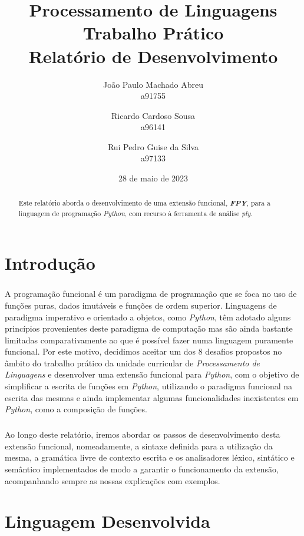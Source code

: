 \documentclass[11pt,a4paper]{report}
\title{Processamento de Linguagens\\
       \textbf{Trabalho Prático}\\ Relatório de Desenvolvimento}
\author{João Paulo Machado Abreu\\ a91755
        \and Ricardo Cardoso Sousa\\ a96141
        \and Rui Pedro Guise da Silva\\ a97133}
\date{28 de maio de 2023}
\begin{document}
\maketitle

\begin{abstract}
\paragraph*{}
Este relatório aborda o desenvolvimento de uma extensão funcional, \textbf{\textit{FPY}}, para a linguagem de programação \textit{Python}, com recurso à ferramenta de análise \textit{ply}.
\end{abstract}

\tableofcontents

\chapter{Introdução} \label{chap:intro}
\paragraph*{}
A programação funcional é um paradigma de programação que se foca no uso de funções puras, dados imutáveis e funções de ordem superior. Linguagens de paradigma imperativo e orientado a objetos, como \textit{Python}, têm adotado alguns princípios provenientes deste paradigma de computação mas são ainda bastante limitadas comparativamente ao que é possível fazer numa linguagem puramente funcional. Por este motivo, decidimos aceitar um dos 8 desafios propostos no âmbito do trabalho prático da unidade curricular de \textit{Processamento de Linguagens} e desenvolver uma extensão funcional para \textit{Python}, com o objetivo de simplificar a escrita de funções em \textit{Python}, utilizando o paradigma funcional na escrita das mesmas e ainda implementar algumas funcionalidades inexistentes em \textit{Python}, como a composição de funções.
\paragraph*{}
Ao longo deste relatório, iremos abordar os passos de desenvolvimento desta extensão funcional, nomeadamente, a sintaxe definida para a utilização da mesma, a gramática livre de contexto escrita e os analisadores léxico, sintático e semântico implementados de modo a garantir o funcionamento da extensão, acompanhando sempre as nossas explicações com exemplos.

\chapter{Linguagem Desenvolvida} \label{chap:analiseEspecificacao}
\end{document}
